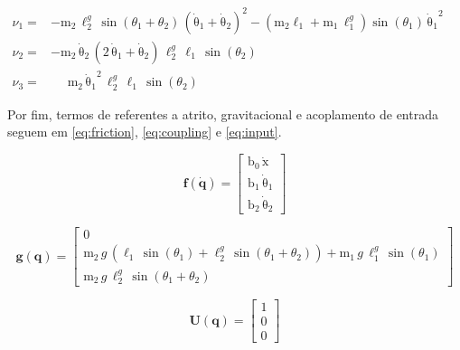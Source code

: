     \begin{equation}
        \begin{aligned}
             \nu_1 = & -\mathrm{m_2} \, \ell_{2}^g\, \sin\!\left(\theta_1 + \theta_2\right)\, (\mathrm{\dot \theta_1} + \mathrm{\dot \theta_2})^2 - (\mathrm{m_2} \mathrm{\ell_1} + \mathrm{m_1}\,\ell_{1}^g)\sin\!\left(\theta_1\right)\, {\mathrm{\dot \theta_1}}^2\\ 
             \nu_2 = & - \mathrm{m_2}\, \mathrm{\dot \theta_2}\, \left(2\, \mathrm{\dot \theta_1} + \mathrm{\dot \theta_2}\right) \, \ell_{2}^g\, \mathrm{\ell_1}\, \sin\!\left(\theta_2\right) \\
             \nu_3 = & \,\,\,\,\,\,\,\,\mathrm{m_2}\, {\mathrm{\dot \theta_1}}^2\, \ell_{2}^g\, \mathrm{\ell_1}\, \sin\!\left(\theta_2\right)
        \end{aligned}
        \phantom{\hspace{6cm}}
    \end{equation}
    
    Por fim, termos de referentes a atrito, gravitacional e acoplamento de entrada seguem em \eqref{eq:friction}, \eqref{eq:coupling} e \eqref{eq:input}.  
    
    \begin{equation}
        \mathbf{f}(\mathbf{\dot q}) = 
        \begin{bmatrix} 
        \mathrm{\mathrm{b_0}}\, \mathrm{\dot x}\\ \mathrm{\mathrm{b_1}}\, \mathrm{\dot \theta_1}\\ \mathrm{\mathrm{b_2}}\, \mathrm{\dot \theta_2} 
        \end{bmatrix}
        \label{eq:friction}
    \end{equation}
    
    \begin{equation}
        \mathbf{g}(\mathbf{q}) = 
        \begin{bmatrix} 
        0
        \\ \mathrm{m_2}\, g \,\left(\mathrm{\ell_1}\, \sin\!\left(\theta_1\right) + \ell_{2}^g\, \sin\!\left(\theta_1 + \theta_2\right)\right) + \mathrm{m_1}\, g \, \ell_{1}^g\, \sin\!\left(\theta_1\right)\\ 
        \mathrm{m_2}\, g\, \ell_{2}^g\, \sin\!\left(\theta_1 + \theta_2\right) \end{bmatrix}
    \end{equation}
    
    \begin{equation}
        \mathbf{U}(\mathbf{q}) = \begin{bmatrix}
        1 \\
        0 \\
        0 
        \end{bmatrix}
        \label{eq:coupling}
    \end{equation}
    

